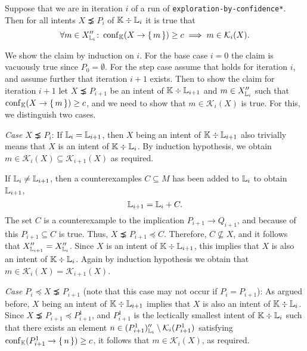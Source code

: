 \begin{Proposition}
  \label{prop:exploration-by-confidence-crucial-condition-holds}
  Suppose that we are in iteration $i$ of a run of
  \lstinline{exploration-by-confidence*}.  Then for all intents $X \precneq P_{i}$ of
  ${\mathbb{K}} \div {\ensuremath{\mathbb{L}}}_{i}$ it is true that
  \begin{equation}
    \label{eq:42}
    \forall m \in X_{{\mathbb{L}}_{i}}'' \colon \operatorname{conf}_{{\mathbb{K}}}(X \to {\ensuremath{\{\,m\,\}}}) \ge c \implies m
    \in \mathcal{K}_{i}(X).
\end{equation}
\end{Proposition}
\begin{Proof}
  We show the claim by induction on $i$.  For the base case $i = 0$ the claim is vacuously
  true since $P_{0} = \emptyset$.  For the step case assume that  holds for
  iteration $i$, and assume further that iteration $i+1$ exists.  Then to show the claim
  for iteration $i+1$ let $X \precneq P_{i+1}$ be an intent of ${\mathbb{K}} \div {\ensuremath{\mathbb{L}}}_{i+1}$
  and $m \in X_{{\mathbb{L}}_{i}}''$ such that $\operatorname{conf}_{{\mathbb{K}}}(X \to {\ensuremath{\{\,m\,\}}}) \ge c$, and we
  need to show that $m \in \mathcal{K}_{i}(X)$ is true.  For this, we distinguish two
  cases.

  \textit{Case $X \precneq P_{i}$}: If ${\mathbb{L}}_{i} = {\mathbb{L}}_{i+1}$, then $X$ being an
  intent of ${\mathbb{K}} \div {\ensuremath{\mathbb{L}}}_{i+1}$ also trivially means that $X$ is an intent of ${\mathbb{K}} \div {\ensuremath{\mathbb{L}}}_{i}$.  By induction hypothesis, we obtain $m \in \mathcal{K}_{i}(X)
  \subseteq \mathcal{K}_{i+1}(X)$ as required.

  If ${\mathbb{L}}_{i} \neq {\ensuremath{\mathbb{L}}}_{i+1}$, then a counterexamples $C \subseteq M$ has been added
  to ${\mathbb{L}}_{i}$ to obtain ${\mathbb{L}}_{i+1}$, \ie
  \begin{equation*}
    {\ensuremath{\mathbb{L}}}_{i+1} = {\mathbb{L}}_{i} + C.
  \end{equation*}
  The set $C$ is a counterexample to the implication $P_{i+1} \to Q_{i+1}$, and because of
  this $P_{i+1} \subseteq C$ is true.  Thus, $X \precneq P_{i+1} \preceq C$.  Therefore,
  $C \not\subseteq X$, and it follows that $X_{{\mathbb{L}}_{i+1}}'' = X_{{\mathbb{L}}_{i}}''$.  Since
  $X$ is an intent of ${\mathbb{K}} \div {\ensuremath{\mathbb{L}}}_{i+1}$, this implies that $X$ is also an intent
  of ${\mathbb{K}} \div {\ensuremath{\mathbb{L}}}_{i}$.  Again by induction hypothesis we obtain that $m \in
  \mathcal{K}_{i}(X) = \mathcal{K}_{i+1}(X)$.

  \textit{Case $P_{i} \preceq X \precneq P_{i+1}$} (note that this case may not occur if
  $P_{i} = P_{i+1}$): As argued before, $X$ being an intent of ${\mathbb{K}} \div {\ensuremath{\mathbb{L}}}_{i+1}$
  implies that $X$ is also an intent of ${\mathbb{K}} \div {\ensuremath{\mathbb{L}}}_{i}$.  Since $X \precneq
  P_{i+1} \preceq P_{i+1}^{1}$, and $P_{i+1}^{1}$ is the lectically smallest intent of
  ${\mathbb{K}} \div {\ensuremath{\mathbb{L}}}_{i}$ such that there exists an element $n \in (P_{i+1}^{1})_{{\mathbb{L}}_{i}}'' \setminus \mathcal{K}_{i}(P_{i+1}^{1})$ satisfying $\operatorname{conf}_{{\mathbb{K}}}(P_{i+1}^{1} \to {\ensuremath{\{\,n\,\}}}) \ge c$, it follows that $m \in \mathcal{K}_{i}(X)$, as
  required.
\end{Proof}

